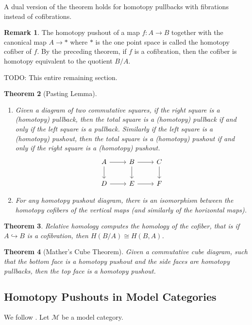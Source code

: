 \documentclass{scrartcl}
\theoremstyle{plain}
\newtheorem{theorem}{Theorem}[section]
\theoremstyle{definition}
\newtheorem{remark}[theorem]{Remark}
\newcommand{\cat}[1]{\mathcal{#1}}
\newcommand{\iso}{\cong}
\newcommand{\injto}{\hookrightarrow}
\begin{document}
A dual version of the theorem holds for homotopy pullbacks with fibrations instead of cofibrations.

\begin{remark}
    The homotopy pushout of a map $f\colon A\to B$ together with the canonical map $A\to *$ where $*$ is the one point space is called the homotopy cofiber of $f$. By the preceding theorem, if $f$ is a cofibration, then the cofiber is homotopy equivalent to the quotient $B/A$.
\end{remark}


TODO: This entire remaining section.

\begin{theorem}[Pasting Lemma]
    \begin{enumerate}
    \item Given a diagram of two commutative squares, if the right square is a (homotopy) pullback, then the total square is a (homotopy) pullback if and only if the left square is a pullback. Similarly if the left square is a (homotopy) pushout, then the total square is a (homotopy) pushout if and only if the right square is a (homotopy) pushout.
\begin{equation}
    \begin{tikzcd}
        A \dar\rar & B \dar\rar &\dar C \\
        D \rar & E \rar & F
    \end{tikzcd}
\end{equation}
    \item For any homotopy pushout diagram, there is an isomorphism between the homotopy cofibers of the vertical maps (and similarly of the horizontal maps).
\end{enumerate}
\end{theorem}

\begin{theorem}
    Relative homology computes the homology of the cofiber, that is if $A\injto B$ is a cofibration, then $H(B/A) \iso H(B, A)$.
\end{theorem}

\begin{theorem}[Mather's Cube Theorem]
    Given a commutative cube diagram, such that the bottom face is a homotopy pushout and the side faces are homotopy pullbacks, then the top face is a homotopy pushout.
\end{theorem}


\subsection{Homotopy Pushouts in Model Categories}
We follow \cite[A.2.4]{lurie2009higher}. 
Let $\cat M$ be a model category.
\end{document}
